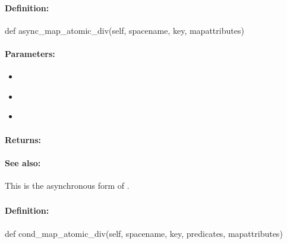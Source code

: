 \paragraph{Definition:}
\begin{pythoncode}
def async_map_atomic_div(self, spacename, key, mapattributes)
\end{pythoncode}

\paragraph{Parameters:}
\begin{itemize}[noitemsep]
\item {}\\

\item {}\\

\item {}\\

\end{itemize}

\paragraph{Returns:}


\paragraph{See also:}  This is the asynchronous form of .

\pagebreak
\subsubsection{}
\label{api:python:cond_map_atomic_div}


\paragraph{Definition:}
\begin{pythoncode}
def cond_map_atomic_div(self, spacename, key, predicates, mapattributes)
\end{pythoncode}

